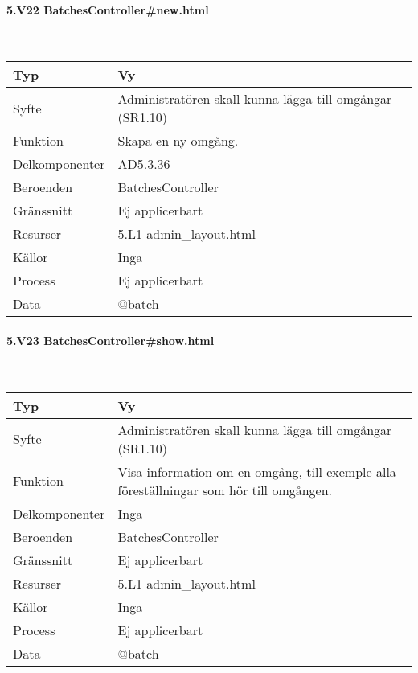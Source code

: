 \documentclass[a4paper, twoside, 11pt, titlepage]{article}
\begin{document}
			\paragraph{5.V22 BatchesController\#new.html}\

			\begin {table} [ht] \begin{tabular} {  p{3.5cm} p{9.6cm} }
				\hline
				Typ & Vy  \\
				\hline
				Syfte & Administratören skall kunna lägga till omgångar (SR1.10)  \\
				\hline
				Funktion & Skapa en ny omgång.  \\
				\hline
				Delkomponenter & AD5.3.36  \\
				\hline
				Beroenden & BatchesController  \\
				\hline
				Gränssnitt & Ej applicerbart  \\
				\hline
				Resurser & 5.L1 admin\_layout.html  \\
				\hline
				Källor & Inga  \\
				\hline
				Process & Ej applicerbart  \\
				\hline
				Data & @batch  \\
				\hline
			\end{tabular} \end{table} \FloatBarrier


			\paragraph{5.V23 BatchesController\#show.html}\

			\begin {table} [ht] \begin{tabular} {  p{3.5cm} p{9.6cm} }
				\hline
				Typ & Vy  \\
				\hline
				Syfte & Administratören skall kunna lägga till omgångar (SR1.10)  \\
				\hline
				Funktion & Visa information om en omgång, till exemple alla föreställningar som hör till omgången.  \\
				\hline
				Delkomponenter & Inga  \\
				\hline
				Beroenden & BatchesController  \\
				\hline
				Gränssnitt & Ej applicerbart  \\
				\hline
				Resurser & 5.L1 admin\_layout.html  \\
				\hline
				Källor & Inga  \\
				\hline
				Process & Ej applicerbart  \\
				\hline
				Data & @batch  \\
				\hline
			\end{tabular} \end{table} \FloatBarrier
\end{document}
